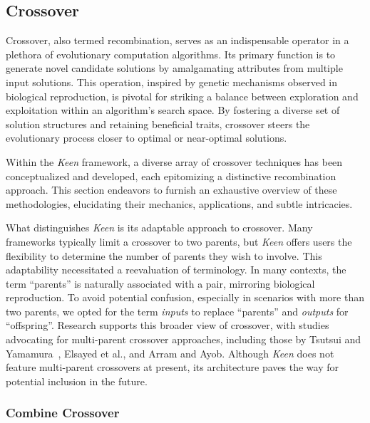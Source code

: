 \subsection{Crossover}
\label{sec:keen:operators:crossover}
  Crossover, also termed recombination, serves as an indispensable operator in 
  a plethora of evolutionary computation algorithms. Its primary function is to 
  generate novel candidate solutions by amalgamating attributes from multiple 
  input solutions. This operation, inspired by genetic mechanisms observed in 
  biological reproduction, is pivotal for striking a balance between 
  exploration and exploitation within an algorithm's search space. By fostering 
  a diverse set of solution structures and retaining beneficial traits, 
  crossover steers the evolutionary process closer to optimal or near-optimal 
  solutions.

  Within the \textit{Keen} framework, a diverse array of crossover techniques 
  has been conceptualized and developed, each epitomizing a distinctive 
  recombination approach. This section endeavors to furnish an exhaustive 
  overview of these methodologies, elucidating their mechanics, applications, 
  and subtle intricacies.

  What distinguishes \textit{Keen} is its adaptable approach to crossover. Many 
  frameworks typically limit a crossover to two parents, but \textit{Keen} 
  offers users the flexibility to determine the number of parents they wish to 
  involve. This adaptability necessitated a reevaluation of terminology. In 
  many contexts, the term \enquote{parents} is naturally associated with a 
  pair, mirroring biological reproduction. To avoid potential confusion, 
  especially in scenarios with more than two parents, we opted for the term 
  \textit{inputs} to replace \enquote{parents} and \textit{outputs} for 
  \enquote{offspring}. Research supports this broader view of crossover, with 
  studies advocating for multi-parent crossover approaches, including those by 
  Tsutsui and Yamamura~\autocite{tsutsuiMultiparentRecombinationSimplex1999}, 
  Elsayed et al.\autocite{elsayedGANewMultiparent2011}, and Arram and 
  Ayob\autocite{arramNovelMultiparentOrder2019}. Although \textit{Keen} does 
  not feature multi-parent crossovers at present, its architecture paves the 
  way for potential inclusion in the future.
  
  \subsubsection{Combine Crossover}
  \label{sec:keen:operators:crossover:combine}
    \Blindtext
